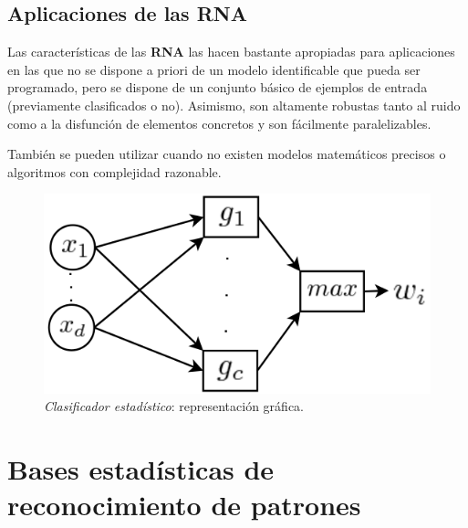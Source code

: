 \documentclass[10pt,a4paper]{article}
\begin{document}
\subsection{Aplicaciones de las RNA}
Las características de las \textbf{RNA} las hacen bastante apropiadas para aplicaciones en las que no se dispone a priori de un modelo identificable que pueda ser programado, pero se dispone de un conjunto básico de ejemplos de entrada (previamente clasificados o no). Asimismo, son altamente robustas tanto al ruido como a la disfunción de elementos concretos y son fácilmente paralelizables.

También se pueden utilizar cuando no existen modelos matemáticos precisos o algoritmos con complejidad razonable. 

\begin{figure}
  \label{fig:clasificador}
  \caption{\textit{Clasificador estadístico}: representación gráfica.}
  \centering
  \hbox{\includegraphics[width=0.3\textwidth-\fboxrule-\fboxrule]{clasificador.png}}  
\end{figure}	

\section{Bases estadísticas de reconocimiento de patrones}
\end{document}
